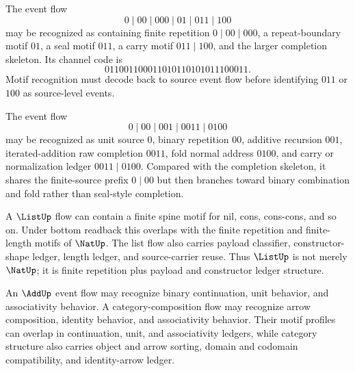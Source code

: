 \begin{example}
\label{ex:motif-generated-completion-skeleton}
The event flow
$$
  0\mid 00\mid 000\mid 01\mid 011\mid 100
$$
may be recognized as containing finite repetition $0\mid 00\mid 000$, a repeat-boundary motif $01$, a seal motif $011$, a carry motif $011\mid 100$, and the larger completion skeleton. Its channel code is
$$
  011001100011010110101011100011.
$$
Motif recognition must decode back to source event flow before identifying $011$ or $100$ as source-level events.
\end{example}

\begin{example}
\label{ex:motif-generated-add-fold-skeleton}
The event flow
$$
  0\mid 00\mid 001\mid 0011\mid 0100
$$
may be recognized as unit source $0$, binary repetition $00$, additive recursion $001$, iterated-addition raw completion $0011$, fold normal address $0100$, and carry or normalization ledger $0011\mid 0100$. Compared with the completion skeleton, it shares the finite-source prefix $0\mid 00$ but then branches toward binary combination and fold rather than seal-style completion.
\end{example}

\begin{example}
\label{ex:motif-generated-list-nat}
A $\ListUp$ flow can contain a finite spine motif for nil, cons, cons-cons, and so on. Under bottom readback this overlaps with the finite repetition and finite-length motifs of $\NatUp$. The list flow also carries payload classifier, constructor-shape ledger, length ledger, and source-carrier reuse. Thus $\ListUp$ is not merely $\NatUp$; it is finite repetition plus payload and constructor ledger structure.
\end{example}

\begin{example}
\label{ex:motif-generated-add-category}
An $\AddUp$ event flow may recognize binary continuation, unit behavior, and associativity behavior. A category-composition flow may recognize arrow composition, identity behavior, and associativity behavior. Their motif profiles can overlap in continuation, unit, and associativity ledgers, while category structure also carries object and arrow sorting, domain and codomain compatibility, and identity-arrow ledger.
\end{example}

